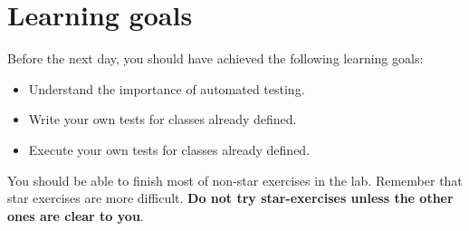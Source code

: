 \documentclass{article}
\begin{document}
\section*{Learning goals}
\label{sec:learning-goals}

Before the next day, you should have achieved the following learning
goals: 

\begin{itemize}
\item Understand the importance of automated testing. 
\item Write your own tests for classes already defined. 
\item Execute your own tests for classes already defined. 
\end{itemize}

You should be able to finish most of non-star exercises in the lab. 
Remember that star exercises are more difficult. 
\textbf{Do not try star-exercises unless the other ones are clear to
  you}.  
\end{document}
